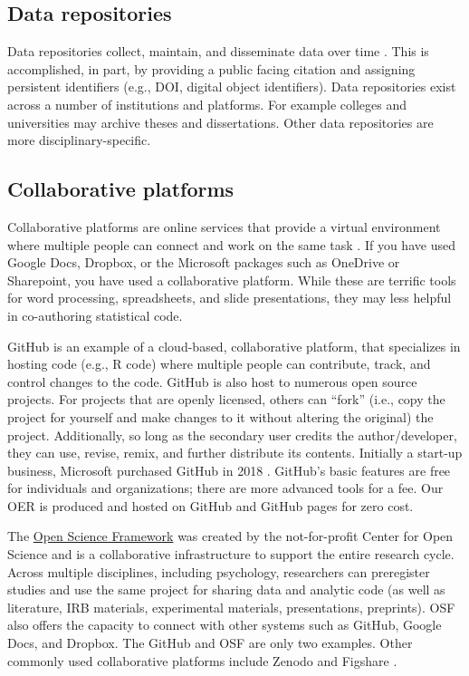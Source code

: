 \documentclass[
  11pt,
]{book}
\begin{document}
\subsection{Data repositories}\label{data-repositories}

Data repositories collect, maintain, and disseminate data over time \citep{alter_responsible_2018}. This is accomplished, in part, by providing a public facing citation and assigning persistent identifiers (e.g., DOI, digital object identifiers). Data repositories exist across a number of institutions and platforms. For example colleges and universities may archive theses and dissertations. Other data repositories are more disciplinary-specific.

\subsection{Collaborative platforms}\label{collaborative-platforms}

Collaborative platforms are online services that provide a virtual environment where multiple people can connect and work on the same task \citep{bezjak_open_2018}. If you have used Google Docs, Dropbox, or the Microsoft packages such as OneDrive or Sharepoint, you have used a collaborative platform. While these are terrific tools for word processing, spreadsheets, and slide presentations, they may less helpful in co-authoring statistical code.

GitHub \citep{noauthor_github_2022} is an example of a cloud-based, collaborative platform, that specializes in hosting code (e.g., R code) where multiple people can contribute, track, and control changes to the code. GitHub is also host to numerous open source projects. For projects that are openly licensed, others can ``fork'' (i.e., copy the project for yourself and make changes to it without altering the original) the project. Additionally, so long as the secondary user credits the author/developer, they can use, revise, remix, and further distribute its contents. Initially a start-up business, Microsoft purchased GitHub in 2018 \href{“GitHub,”\%202022b}{\citet{noauthor_github_2022-1}}. GitHub's basic features are free for individuals and organizations; there are more advanced tools for a fee. Our OER is produced and hosted on GitHub and GitHub pages for zero cost.

The \href{OSF;\%20https://osf.io/}{Open Science Framework} \citep{osf_open_2022} was created by the not-for-profit Center for Open Science and is a collaborative infrastructure to support the entire research cycle. Across multiple disciplines, including psychology, researchers can preregister studies and use the same project for sharing data and analytic code (as well as literature, IRB materials, experimental materials, presentations, preprints). OSF also offers the capacity to connect with other systems such as GitHub, Google Docs, and Dropbox. The GitHub and OSF are only two examples. Other commonly used collaborative platforms include Zenodo and Figshare \citep{martone_data_2018}.
\end{document}
